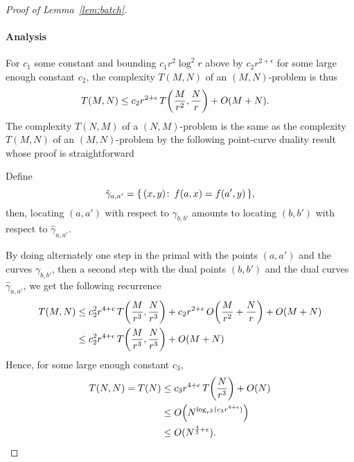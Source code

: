 \begin{proof}[Proof of Lemma~\ref{lem:batch}]
\paragraph{Analysis} For $c_1$ some constant and bounding $c_1 r^{2} \log^2 r$
above by $c_2 r^{2+\epsilon}$ for some large enough constant $c_2$, the
complexity $T(M,N)$ of an $(M,N)$-problem is thus
\begin{align*}
    T(M,N) &\le c_2 r^{2+\epsilon}\,T\mleft(\frac{M}{r^{2}},\frac{N}{r}\mright) + O(M+N).
\end{align*}
The complexity $T(N,M)$ of a \((N,M)\)-problem is the same as the
complexity $T(M,N)$ of an \((M,N)\)-problem by the following point-curve
duality result whose proof is straightforward
\begin{lemma}\label{lem:dual}
Define
\begin{displaymath}
    \hat{\gamma}_{a,a'} = \{\, (x,y) \colon\, f(a,x)=f(a',y)\,\},
\end{displaymath}
then, locating $(a,a')$ with respect to $\gamma_{b,b'}$ amounts to
locating $(b,b')$ with respect to $\hat{\gamma}_{a,a'}$.
\end{lemma}

By doing alternately one step in the primal with the points $(a,a')$ and the
curves $\gamma_{b,b'}$, then a second step with the dual points $(b,b')$ and the
dual curves $\hat{\gamma}_{a,a'}$, we get the following recurrence
\begin{align*}
    T(M,N) &\le c_2^2 r^{4+\epsilon}\,T\mleft(\frac{M}{r^{3}},\frac{N}{r^{3}}\mright) +
	c_2 r^{2+\epsilon}\,O\mleft(\frac{M}{r^2} + \frac{N}{r}\mright) +
	O(M+N)\\
	&\le c_2^2 r^{4+\epsilon}\,T\mleft(\frac{M}{r^{3}},\frac{N}{r^{3}}\mright) +
	O(M+N)
\end{align*}
Hence, for some large enough constant $c_3$,
\begin{align*}
T(N,N) = T(N) &\le c_3 r^{4+\epsilon}\,T\mleft(\frac{N}{r^{3}}\mright) + O(N)\\
	      &\le O\mleft(N^{\log_{r^{3}} (c_3  r^{4+\epsilon})}\mright)\\
	&\le O(N^{\frac 43 + \epsilon}).
\end{align*}
\end{proof}



